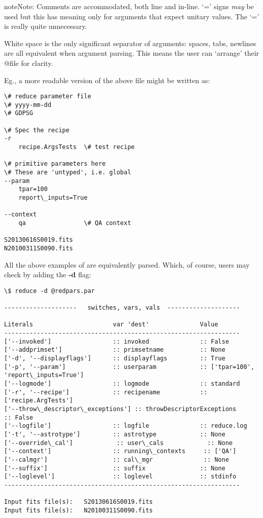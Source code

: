 \documentclass[letterpaper,10pt,english]{sphinxmanual}
\begin{document}
\begin{notice}{note}{Note:}
Comments are accommodated, both line and in-line. `=' signs \emph{may} be
used but this has meaning only for arguments that expect unitary values.
The `=' is really quite unnecessary.

White space is the only significant separator of arguments: spaces,
tabs, newlines are all equivalent when argument parsing. This means
the user can `arrange' their @file for clarity.

Eg., a more readable version of the above file might be written as:

\begin{Verbatim}[commandchars=\\\{\}]
\# reduce parameter file
\# yyyy-mm-dd
\# GDPSG

\# Spec the recipe
-r
    recipe.ArgsTests  \# test recipe

\# primitive parameters here
\# These are 'untyped', i.e. global
--param
    tpar=100
    report\_inputs=True

--context
    qa                \# QA context

S20130616S0019.fits
N20100311S0090.fits
\end{Verbatim}
\end{notice}

All the above  examples of  are equivalently parsed. Which,
of course, users may check by adding the \textbf{-d} flag:

\begin{Verbatim}[commandchars=\\\{\}]
\$ reduce -d @redpars.par

--------------------   switches, vars, vals  --------------------

Literals                      var 'dest'              Value
-----------------------------------------------------------------
['--invoked']                 :: invoked              :: False
['--addprimset']              :: primsetname          :: None
['-d', '--displayflags']      :: displayflags         :: True
['-p', '--param']             :: userparam            :: ['tpar=100', 'report\_inputs=True']
['--logmode']                 :: logmode              :: standard
['-r', '--recipe']            :: recipename           :: ['recipe.ArgTests']
['--throw\_descriptor\_exceptions'] :: throwDescriptorExceptions        :: False
['--logfile']                 :: logfile              :: reduce.log
['-t', '--astrotype']         :: astrotype            :: None
['--override\_cal']            :: user\_cals            :: None
['--context']                 :: running\_contexts     :: ['QA']
['--calmgr']                  :: cal\_mgr              :: None
['--suffix']                  :: suffix               :: None
['--loglevel']                :: loglevel             :: stdinfo
-----------------------------------------------------------------

Input fits file(s):   S20130616S0019.fits
Input fits file(s):   N20100311S0090.fits
\end{Verbatim}
\end{document}
